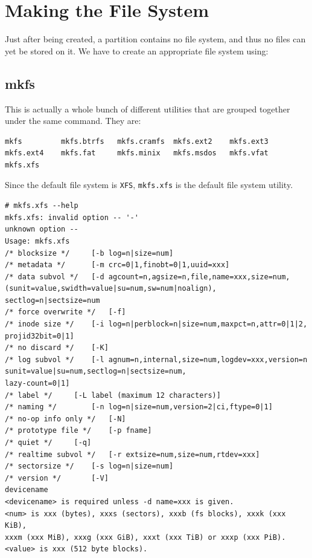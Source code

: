 \section{Making the File System}
Just after being created, a partition contains no file system, and thus no files can yet be stored on it. We have to create an appropriate file system using:

\subsection{mkfs}
This is actually a whole bunch of different utilities that are grouped together under the same command. They are:

\vspace{-15pt}
\begin{verbatim}
mkfs         mkfs.btrfs   mkfs.cramfs  mkfs.ext2    mkfs.ext3    mkfs.ext4    mkfs.fat     mkfs.minix   mkfs.msdos   mkfs.vfat    mkfs.xfs     
\end{verbatim}
\vspace{-10pt}

\noindent
Since the default file system is \verb|XFS|, \verb|mkfs.xfs| is the default file system utility. 

\vspace{-15pt}
\begin{verbatim}
# mkfs.xfs --help
mkfs.xfs: invalid option -- '-'
unknown option -- 
Usage: mkfs.xfs
/* blocksize */		[-b log=n|size=num]
/* metadata */		[-m crc=0|1,finobt=0|1,uuid=xxx]
/* data subvol */	[-d agcount=n,agsize=n,file,name=xxx,size=num,
(sunit=value,swidth=value|su=num,sw=num|noalign),
sectlog=n|sectsize=num
/* force overwrite */	[-f]
/* inode size */	[-i log=n|perblock=n|size=num,maxpct=n,attr=0|1|2,
projid32bit=0|1]
/* no discard */	[-K]
/* log subvol */	[-l agnum=n,internal,size=num,logdev=xxx,version=n
sunit=value|su=num,sectlog=n|sectsize=num,
lazy-count=0|1]
/* label */		[-L label (maximum 12 characters)]
/* naming */		[-n log=n|size=num,version=2|ci,ftype=0|1]
/* no-op info only */	[-N]
/* prototype file */	[-p fname]
/* quiet */		[-q]
/* realtime subvol */	[-r extsize=num,size=num,rtdev=xxx]
/* sectorsize */	[-s log=n|size=num]
/* version */		[-V]
devicename
<devicename> is required unless -d name=xxx is given.
<num> is xxx (bytes), xxxs (sectors), xxxb (fs blocks), xxxk (xxx KiB),
xxxm (xxx MiB), xxxg (xxx GiB), xxxt (xxx TiB) or xxxp (xxx PiB).
<value> is xxx (512 byte blocks).
\end{verbatim}
\vspace{-10pt}


